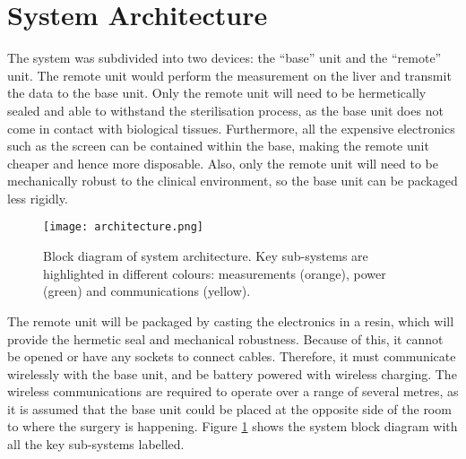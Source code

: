 \section{System Architecture}

The system was subdivided into two devices: the ``base'' unit and the ``remote'' unit. The remote unit would perform the measurement on the liver and transmit the data to the base unit. Only the remote unit will need to be hermetically sealed and able to withstand the sterilisation process, as the base unit does not come in contact with biological tissues. Furthermore, all the expensive electronics such as the screen can be contained within the base, making the remote unit cheaper and hence more disposable. Also, only the remote unit will need to be mechanically robust to the clinical environment, so the base unit can be packaged less rigidly. 



\begin{figure}[htbp]
	\centering
	\texttt{[image: architecture.png]}
	\caption{Block diagram of system architecture. Key sub-systems are highlighted in different colours: measurements (orange), power (green) and communications (yellow).}
	\label{fig: architecture}
\end{figure}

The remote unit will be packaged by casting the electronics in a resin, which will provide the hermetic seal and mechanical robustness. Because of this, it cannot be opened or have any sockets to connect cables. Therefore, it must communicate wirelessly with the base unit, and be battery powered with wireless charging. The wireless communications are required to operate over a range of several metres, as it is assumed that the base unit could be placed at the opposite side of the room to where the surgery is happening. Figure \ref{fig: architecture} shows the system block diagram with all the key sub-systems labelled.